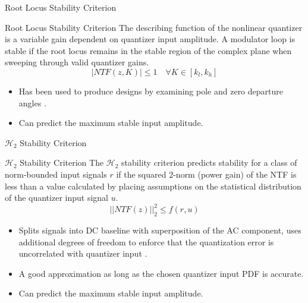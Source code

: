 \documentclass[10pt,usenames,dvipsnames]{beamer}
\begin{document}
\begin{frame}{Root Locus Stability Criterion}

\begin{block}{Root Locus Stability Criterion}
	The describing function of the nonlinear quantizer is a variable gain dependent on quantizer input amplitude. A modulator loop is stable if the root locus remains in the stable region of the complex plane when sweeping through valid quantizer gains.
	\begin{equation*}
		|NTF(z, K)| \leq 1 \quad \forall K \in [k_l, k_h]
	\end{equation*}
\end{block}

\begin{itemize}
	\item Has been used to produce designs by examining pole and zero departure angles \cite{Yang2002, Kuo2006, Kang2014}.
	\item Can predict the maximum stable input amplitude.
\end{itemize}

\end{frame}

\begin{frame}{$\mathcal{H}_2$ Stability Criterion}

\begin{block}{$\mathcal{H}_2$ Stability Criterion}
	The $\mathcal{H}_2$ stability criterion predicts stability for a class of norm-bounded input signals $r$ if the squared 2-norm (power gain) of the NTF is less than a value calculated by placing assumptions on the statistical distribution of the quantizer input signal $u$.
	\begin{equation*}
		||NTF(z)||_2^2 \leq f(r,u)
	\end{equation*}
\end{block}

\begin{itemize}
	\item Splits signals into DC baseline with superposition of the AC component, uses additional degrees of freedom to enforce that the quantization error is uncorrelated with quantizer input \cite{Risbo1994}.
	\item A good approximation as long as the chosen quantizer input PDF is accurate.
	\item Can predict the maximum stable input amplitude.
\end{itemize}

\end{frame}
\end{document}
